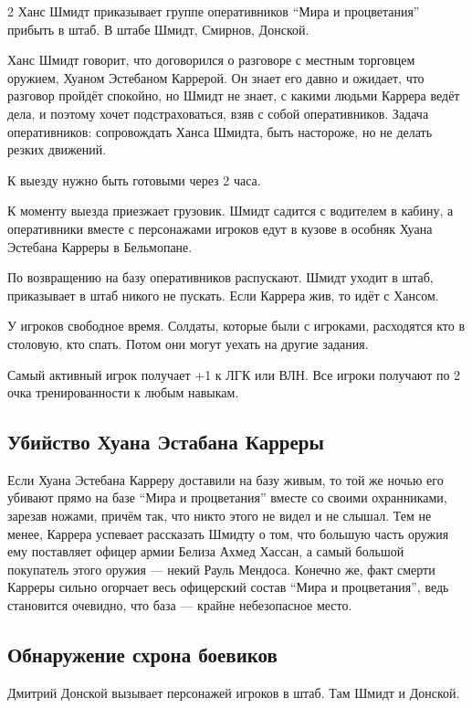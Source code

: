\documentclass[twoside]{article}
\begin{document}
\begin{multicols}{2}
Ханс Шмидт приказывает группе оперативников \enquote{Мира и процветания} прибыть
в штаб. В штабе Шмидт, Смирнов, Донской.

Ханс Шмидт говорит, что договорился о разговоре с местным торговцем
оружием, Хуаном Эстебаном Каррерой. Он знает его давно и ожидает, что
разговор пройдёт спокойно, но Шмидт не знает, с какими людьми Каррера
ведёт дела, и поэтому хочет подстраховаться, взяв с собой оперативников.
Задача оперативников: сопровождать Ханса Шмидта, быть настороже, но не
делать резких движений.

К выезду нужно быть готовыми через 2 часа.

К моменту выезда приезжает грузовик. Шмидт садится с водителем в кабину,
а оперативники вместе с персонажами игроков едут в кузове в особняк
Хуана Эстебана Карреры в Бельмопане.

По возвращению на базу оперативников распускают. Шмидт уходит в штаб,
приказывает в штаб никого не пускать. Если Каррера жив, то идёт с
Хансом.

У игроков свободное время. Солдаты, которые были с игроками, расходятся
кто в столовую, кто спать. Потом они могут уехать на другие задания.

Самый активный игрок получает +1 к ЛГК или ВЛН. Все игроки получают по 2 очка
тренированности к любым навыкам.

\subsection{Убийство Хуана Эстабана Карреры}\label{carrera-murder}

Если Хуана Эстебана Карреру доставили на базу живым, то той же ночью его
убивают прямо на базе \enquote{Мира и процветания} вместе со своими охранниками,
зарезав ножами, причём так, что никто этого не видел и не слышал. Тем не
менее, Каррера успевает рассказать Шмидту о том, что большую часть
оружия ему поставляет офицер армии Белиза Ахмед Хассан, а самый большой
покупатель этого оружия --- некий Рауль Мендоса. Конечно же, факт смерти
Карреры сильно огорчает весь офицерский состав \enquote{Мира и процветания},
ведь становится очевидно, что база --- крайне небезопасное место.

\subsection{Обнаружение схрона боевиков}\label{hideout-discovery}

Дмитрий Донской вызывает персонажей игроков в штаб. Там Шмидт и Донской.


\end{multicols}
\end{document}

